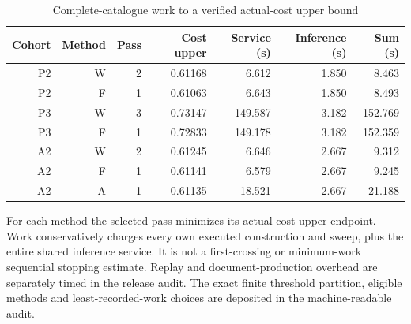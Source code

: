 \begin{table}[htbp]
\centering
\caption{Complete-catalogue work to a verified actual-cost upper bound}\label{tab:catalogue54}
{\small\setlength{\tabcolsep}{4pt}
\begin{tabular}{rrr r r r r}
\hline
Cohort & Method & Pass & Cost upper & Service (s) & Inference (s) & Sum (s) \\
\hline
P2 & W & 2 & 0.61168 & 6.612 & 1.850 & 8.463 \\
P2 & F & 1 & 0.61063 & 6.643 & 1.850 & 8.493 \\
P3 & W & 3 & 0.73147 & 149.587 & 3.182 & 152.769 \\
P3 & F & 1 & 0.72833 & 149.178 & 3.182 & 152.359 \\
A2 & W & 2 & 0.61245 & 6.646 & 2.667 & 9.312 \\
A2 & F & 1 & 0.61141 & 6.579 & 2.667 & 9.245 \\
A2 & A & 1 & 0.61135 & 18.521 & 2.667 & 21.188 \\
\hline
\end{tabular}}
\par\smallskip
{\footnotesize For each method the selected pass minimizes its actual-cost upper endpoint. Work conservatively charges every own executed construction and sweep, plus the entire shared inference service. It is not a first-crossing or minimum-work sequential stopping estimate. Replay and document-production overhead are separately timed in the release audit. The exact finite threshold partition, eligible methods and least-recorded-work choices are deposited in the machine-readable audit.}
\end{table}
